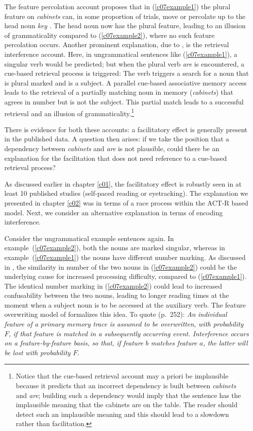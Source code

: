 \documentclass{cambridge7A}\usepackage[]{graphicx}\usepackage[]{color}
\begin{document}
The feature percolation account proposes that in (\ref{c07example1}) the plural feature on \textit{cabinets} can, in some proportion of trials, move or percolate up to the head noun \textit{key}  \citep[see][for recent evidence for this model]{patson2016misinterpretations}. The head noun now has the plural feature, leading to an illusion of grammaticality compared to (\ref{c07example2}), where no such feature percolation occurs. 
Another prominent explanation, due to \cite{WagersLauPhillips2009}, is the retrieval interference account. Here, in ungrammatical sentences like (\ref{c07example1}), a singular verb would be predicted; but when the plural verb \textit{are} is encountered, a cue-based retrieval process is triggered: The verb triggers a search for a noun that is plural marked and is a subject. A parallel cue-based associative memory access leads to the retrieval of a partially matching noun in memory (\textit{cabinets}) that agrees in number but is not the subject. This partial match leads to a successful retrieval and an illusion of grammaticality.\footnote{Notice that the cue-based retrieval account may a priori be implausible because it predicts that an incorrect dependency is built between \textit{cabinets} and \textit{are}; building such a dependency would imply that the sentence has the implausible meaning that the cabinets are on the table. The reader should detect such an implausible meaning and this should lead to a slowdown rather than facilitation.} 

There is evidence for both these accounts: a facilitatory effect is generally present in the published data. 
A question then arises: if we take the position that a dependency between \textit{cabinets} and \textit{are} is not plausible, could there be an explanation for the facilitation that does not need reference to a cue-based retrieval process?

As discussed earlier in chapter \ref{c01}, the facilitatory effect is robustly seen in at least 10 published studies (self-paced reading or eyetracking). The explanation we presented in chapter \ref{c02} was in terms of a race process within the ACT-R based model. Next, we consider an alternative explanation in terms of encoding interference.

Consider the ungrammatical example sentences again. In example~(\ref{c07example2}),
both the nouns are marked singular, whereas in example~(\ref{c07example1}) the nouns have different number marking. 
As discussed in \cite{VillataFranck},
the similarity in number of the two nouns in (\ref{c07example2}) could be the underlying cause for increased processing difficulty, compared to (\ref{c07example1}).
The identical number marking in (\ref{c07example2}) could lead to increased confusability between the two nouns, leading to longer reading times at the moment when a subject noun is to be accessed at the auxiliary verb. 
The feature overwriting model of \cite{Nairne1990} formalizes this idea. To quote (p.\ 252):
\textit{An individual feature of a primary memory trace is assumed to be overwritten, with probability $F$, if that feature is matched in a subsequently occurring event. Interference occurs on a feature-by-feature basis, so that, if feature $b$ matches feature $a$, the latter will be lost with probability $F$}.
\end{document}
